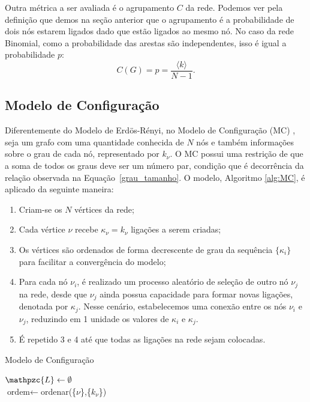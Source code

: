 Outra métrica a ser avaliada é o agrupamento $C$ da rede. Podemos ver pela definição que demos na seção anterior que o agrupamento é a probabilidade de dois nós estarem ligados dado que estão ligados ao mesmo nó. 
No caso da rede Binomial, como a probabilidade das arestas são independentes,
isso é 
igual 
a probabilidade $p$:
\begin{equation}
  C(G) = p = \frac{\langle k \rangle}{N - 1}.
\end{equation}

\subsection{Modelo de Configuração}

Diferentemente do Modelo de Erdös-Rényi, no Modelo de Configuração (MC) \cite{networks}, seja um grafo com uma quantidade conhecida de $N$ nós e também informações sobre o grau de cada nó, representado por
$k_\nu$. O MC 
possui uma restrição de que a soma de todos os graus deve ser um número par, condição 
que é decorrência da relação observada na
Equação~\ref{grau_tamanho}. O modelo, Algoritmo \ref{alg:MC}, é aplicado da seguinte maneira:
\begin{enumerate}
  \item Criam-se os $N$ vértices da rede;
  \item Cada vértice $\nu$ recebe
  $\kappa_\nu = k_\nu$ ligações a serem criadas;
  \item Os vértices são ordenados de forma decrescente de grau da sequência $\{\kappa_i\}$ para facilitar a convergência do modelo;
  \item Para cada nó $\nu_i$, é realizado um processo aleatório de seleção de outro nó $\nu_j$ na rede, desde que $\nu_j$ ainda possua capacidade para formar novas ligações, denotada por 
  $\kappa_j$. Nesse cenário, estabelecemos uma conexão entre os nós $\nu_i$ e $\nu_j$, reduzindo em 1 unidade os valores de
  $\kappa_i$ e $\kappa_j$.
  \item É repetido 3 e 4 até que todas as ligações na rede sejam colocadas. 
\end{enumerate}
\begin{algorithm}[htbp]
   \caption{Modelo de Configuração}
   \label{alg:MC}
   
   $\mathpzc{L} \gets \emptyset$\\
   $\text{ordem} \gets $ordenar(\{$\nu$\},\{$k_\nu$\}) 
   
\end{algorithm}

